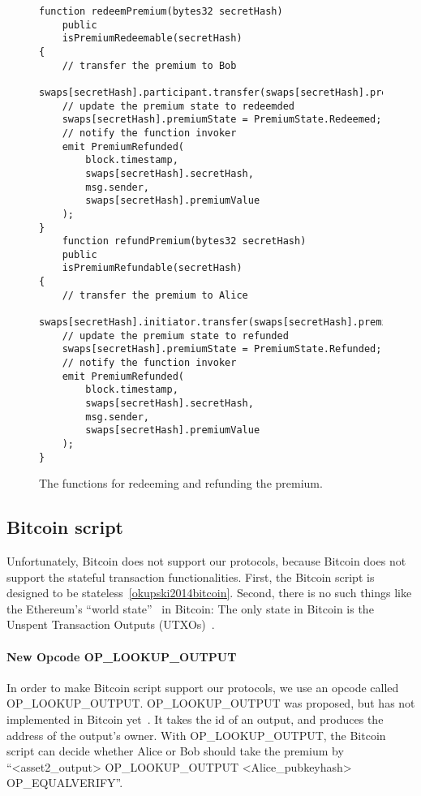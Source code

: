 \begin{figure}
\begin{lstlisting}[language=Solidity, basicstyle=\tiny]
function redeemPremium(bytes32 secretHash)
    public
    isPremiumRedeemable(secretHash)
{
    // transfer the premium to Bob
    swaps[secretHash].participant.transfer(swaps[secretHash].premiumValue);
    // update the premium state to redeemded
    swaps[secretHash].premiumState = PremiumState.Redeemed;
    // notify the function invoker
    emit PremiumRefunded(
        block.timestamp,
        swaps[secretHash].secretHash,
        msg.sender,
        swaps[secretHash].premiumValue
    );
}
    function refundPremium(bytes32 secretHash)
    public
    isPremiumRefundable(secretHash)
{
    // transfer the premium to Alice
    swaps[secretHash].initiator.transfer(swaps[secretHash].premiumValue);
    // update the premium state to refunded
    swaps[secretHash].premiumState = PremiumState.Refunded;
    // notify the function invoker
    emit PremiumRefunded(
        block.timestamp,
        swaps[secretHash].secretHash,
        msg.sender,
        swaps[secretHash].premiumValue
    );
}
\end{lstlisting}
\label{code:premium_redeem_refund_function}
\caption{The functions for redeeming and refunding the premium.}
\end{figure}


\subsection{Bitcoin script}

Unfortunately, Bitcoin does not support our protocols, because Bitcoin does not support the stateful transaction functionalities.
First, the Bitcoin script is designed to be stateless~\ref{okupski2014bitcoin}.
Second, there is no such things like the Ethereum's ``world state''~\cite{wood2014ethereum} in Bitcoin:
The only state in Bitcoin is the Unspent Transaction Outputs (UTXOs)~\cite{nakamoto2008bitcoin}.


\paragraph{New Opcode OP\_LOOKUP\_OUTPUT}
In order to make Bitcoin script support our protocols, we use an opcode called OP\_LOOKUP\_OUTPUT.
OP\_LOOKUP\_OUTPUT was proposed, but has not implemented in Bitcoin yet~\cite{op-lookup-output-origin}.
It takes the id of an output, and produces the address of the output's owner.
With OP\_LOOKUP\_OUTPUT, the Bitcoin script can decide whether Alice or Bob should take the premium by
``<asset2\_output> OP\_LOOKUP\_OUTPUT <Alice\_pubkeyhash> OP\_EQUALVERIFY''.

